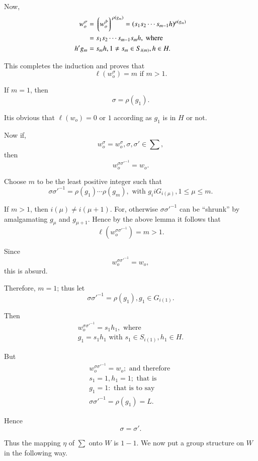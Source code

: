 Now,
\begin{align*}
  w_o ^{\sigma} & = \bigg\lgroup w_o ^{\hat{\sigma}}\bigg\rgroup
  ^{\rho (g_m)} = (s_1 s_2 \cdots  s_{m-1} h) ^{\rho (g_m)}\\ 
  & = s_1 s_2 \cdots s_{m-1} s_m h, \text{ where }\\
  h' g_m &= s_m h,  1 \neq s_m \in S_{i (m)}, h \in H.
\end{align*}

This completes the induction and proves that
$$
\ell (w_o ^{\sigma}) = m \text{ if } m > 1.
$$

If $m=1$, then
$$
\sigma = \rho(g_1).
$$

It\pageoriginale is obvious that $\ell (w_o) = 0  $ or $1$ according as $g_1$ is in
$H$ or not. 

Now if,
$$
w_o ^{\sigma} = w_o ^{\sigma}, \sigma, \sigma' \in \sum,
$$
then 
$$
w_o^{\sigma \sigma'^{-1}} = w_o.
$$

Choose $m$ to be the least positive integer such that 
$$
\sigma \sigma'^{-1} = \rho (g_1) \cdots \rho (g_m), \text{ with } g_i
i G_{i (\mu)}, 1 \leq \mu \leq m. 
$$

If $m > 1$, then $i (\mu)\neq i (\mu + 1)$. For, otherwise $\sigma
\sigma'^{-1}$ can be ``shrunk'' by amalgamating $g_{\mu}$ and $g_{\mu
  +1}$. Hence by the above lemma it follows that 
$$
\ell (w_o^{\sigma \sigma'^{-1}}) = m > 1.
$$

Since 
$$
w_o^{\sigma \sigma'^{-1}} = w_o,
$$
this is absurd.

Therefore, $ m = 1 $; thus let
$$
\sigma \sigma'^{-1} = \rho (g_1), g_1 \in G_{i (1)}.
$$

Then\pageoriginale
\begin{gather*}
  w_o ^{\sigma \sigma'^{-1}} = s_1 h_1, \text{ where }\\
  g_1 = s_1 h_1 \text{ with } s_1 \in S_{i (1)}, h_1 \in H.
\end{gather*}

But
\begin{gather*}
  w_o ^{\sigma \sigma'^{-1}} = w_o; \text{ and therefore }\\
  s_1 = 1, h_1 = 1; \text{ that is }\\
  g_1 = 1 : \text{ that is to say }\\
  {\sigma \sigma'^{-1}} = \rho (g_1) = L.
\end{gather*}

Hence 
$$
\sigma = \sigma'.
$$

Thus the mapping $\eta$ of $\sum$ onto $W$ is $1-1$. We now put a
group structure on $W$ in the following way. 


